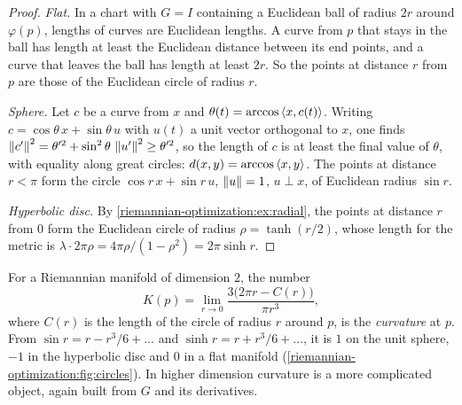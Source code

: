 \begin{notechapter}
\begin{proof}
\emph{Flat.} In a chart with $G = I$ containing a Euclidean ball of
radius $2r$ around $\varphi(p)$, lengths of curves are Euclidean lengths.
A curve from $p$ that stays in the ball has length at least the Euclidean
distance between its end points, and a curve that leaves the ball has
length at least $2r$. So the points at distance $r$ from $p$ are those of
the Euclidean circle of radius $r$.

\emph{Sphere.} Let $c$ be a curve from $x$ and
$\theta(t) = \arccos\left\langle x, c(t) \right\rangle$. Writing
$c = \cos\theta\,x + \sin\theta\,u$ with $u(t)$ a unit vector orthogonal
to $x$, one finds
$\left\|c'\right\|^2 = \theta'^2 + \sin^2\theta\,\left\|u'\right\|^2\geq\theta'^2$, so
the length of $c$ is at least the final value of $\theta$, with equality
along great circles: $d(x, y) = \arccos\left\langle x, y \right\rangle$. The points at distance
$r < \pi$ form the circle $\cos r\,x + \sin r\,u$, $\left\|u\right\| = 1$,
$u\perp x$, of Euclidean radius $\sin r$.

\emph{Hyperbolic disc.} By \cref{riemannian-optimization:ex:radial}, the
points at distance $r$ from $0$ form the Euclidean circle of radius
$\rho = \tanh(r/2)$, whose length for the metric is
$\lambda\cdot2\pi\rho = 4\pi\rho/(1 - \rho^2) = 2\pi\sinh r$.
\end{proof}

For a Riemannian manifold of dimension $2$, the number
\[
  K(p) = \lim_{r\to0}\frac{3\bigl(2\pi r - C(r)\bigr)}{\pi r^3} ,
\]
where $C(r)$ is the length of the circle of radius $r$ around $p$, is the
\emph{curvature} at $p$. From $\sin r = r - r^3/6 + \dots$ and
$\sinh r = r + r^3/6 + \dots$, it is $1$ on the unit sphere, $-1$ in the
hyperbolic disc and $0$ in a flat manifold
(\cref{riemannian-optimization:fig:circles}). In higher dimension
curvature is a more complicated object, again built from $G$ and its
derivatives.


\end{notechapter}
